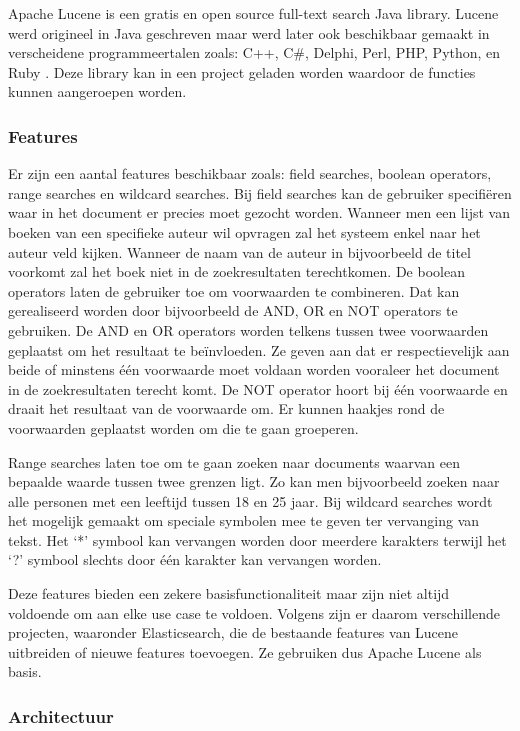 Apache Lucene is een gratis en open source full-text search Java library. Lucene werd origineel in Java geschreven maar werd later ook beschikbaar gemaakt in verscheidene programmeertalen zoals: C++, C\#, Delphi, Perl, PHP, Python, en Ruby \autocite{Whissel2009}. Deze library kan in een project geladen worden waardoor de functies kunnen aangeroepen worden.

\subsubsection{Features}

Er zijn een aantal features beschikbaar zoals: field searches, boolean operators, range searches en wildcard searches. Bij field searches kan de gebruiker specifiëren waar in het document er precies moet gezocht worden. Wanneer men een lijst van boeken van een specifieke auteur wil opvragen zal het systeem enkel naar het auteur veld kijken. Wanneer de naam van de auteur in bijvoorbeeld de titel voorkomt zal het boek niet in de zoekresultaten terechtkomen. De boolean operators laten de gebruiker toe om voorwaarden te combineren. Dat kan gerealiseerd worden door bijvoorbeeld de AND, OR en NOT operators te gebruiken. De AND en OR operators worden telkens tussen twee voorwaarden geplaatst om het resultaat te beïnvloeden. Ze geven aan dat er respectievelijk aan beide of minstens één voorwaarde moet voldaan worden vooraleer het document in de zoekresultaten terecht komt. De NOT operator hoort bij één voorwaarde en draait het resultaat van de voorwaarde om. Er kunnen haakjes rond de voorwaarden geplaatst worden om die te gaan groeperen.

Range searches laten toe om te gaan zoeken naar documents waarvan een bepaalde waarde tussen twee grenzen ligt. Zo kan men bijvoorbeeld zoeken naar alle personen met een leeftijd tussen 18 en 25 jaar. Bij wildcard searches wordt het mogelijk gemaakt om speciale symbolen mee te geven ter vervanging van tekst. Het ‘*’ symbool kan vervangen worden door meerdere karakters terwijl het ‘?’ symbool slechts door één karakter kan vervangen worden. 

Deze features bieden een zekere basisfunctionaliteit maar zijn niet altijd voldoende om aan elke use case te voldoen. Volgens \textcite{Whissel2009} zijn er daarom verschillende projecten, waaronder Elasticsearch, die de bestaande features van Lucene uitbreiden of nieuwe features toevoegen. Ze gebruiken dus Apache Lucene als basis.

\subsubsection{Architectuur}

